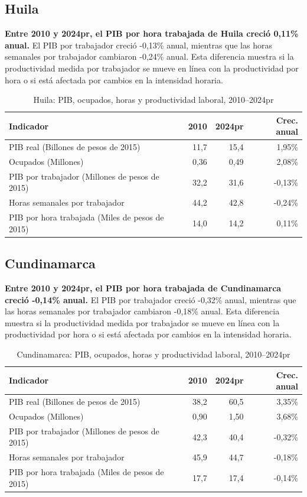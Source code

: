 \subsection{Huila}
\textbf{Entre 2010 y 2024pr, el PIB por hora trabajada de Huila creció 0,11\% anual.} El PIB por trabajador creció -0,13\% anual, mientras que las horas semanales por trabajador cambiaron -0,24\% anual. Esta diferencia muestra si la productividad medida por trabajador se mueve en línea con la productividad por hora o si está afectada por cambios en la intensidad horaria.
\begin{table}[H]
\centering
\caption{Huila: PIB, ocupados, horas y productividad laboral, 2010--2024pr}
\label{tab:departamento_huila_productividad}
\scriptsize
\begin{tabular}{lrrr}
\toprule
Indicador & 2010 & 2024pr & Crec. anual \\
\midrule
PIB real (Billones de pesos de 2015) & 11,7 & 15,4 & 1,95\% \\
Ocupados (Millones) & 0,36 & 0,49 & 2,08\% \\
PIB por trabajador (Millones de pesos de 2015) & 32,2 & 31,6 & -0,13\% \\
Horas semanales por trabajador & 44,2 & 42,8 & -0,24\% \\
PIB por hora trabajada (Miles de pesos de 2015) & 14,0 & 14,2 & 0,11\% \\
\bottomrule
\end{tabular}
\end{table}

\subsection{Cundinamarca}
\textbf{Entre 2010 y 2024pr, el PIB por hora trabajada de Cundinamarca creció -0,14\% anual.} El PIB por trabajador creció -0,32\% anual, mientras que las horas semanales por trabajador cambiaron -0,18\% anual. Esta diferencia muestra si la productividad medida por trabajador se mueve en línea con la productividad por hora o si está afectada por cambios en la intensidad horaria.
\begin{table}[H]
\centering
\caption{Cundinamarca: PIB, ocupados, horas y productividad laboral, 2010--2024pr}
\label{tab:departamento_cundinamarca_productividad}
\scriptsize
\begin{tabular}{lrrr}
\toprule
Indicador & 2010 & 2024pr & Crec. anual \\
\midrule
PIB real (Billones de pesos de 2015) & 38,2 & 60,5 & 3,35\% \\
Ocupados (Millones) & 0,90 & 1,50 & 3,68\% \\
PIB por trabajador (Millones de pesos de 2015) & 42,3 & 40,4 & -0,32\% \\
Horas semanales por trabajador & 45,9 & 44,7 & -0,18\% \\
PIB por hora trabajada (Miles de pesos de 2015) & 17,7 & 17,4 & -0,14\% \\
\bottomrule
\end{tabular}
\end{table}

